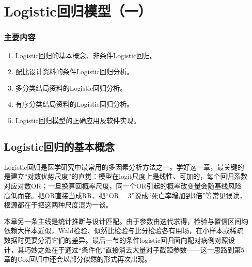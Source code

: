 \chapter{Logistic回归模型（一）}
\subsection*{主要内容}
\begin{enumerate}
\item Logistic回归的基本概念、非条件Logistic回归。
\item 配比设计资料的条件Logistic回归分析。
\item 多分类结局资料的Logistic回归分析。
\item 有序分类结局资料的Logistic回归分析。
\item Logistic回归模型的正确应用及软件实现。
\end{enumerate}
\section{Logistic回归的基本概念}
Logistic回归是医学研究中最常用的多因素分析方法之一。学好这一章，最关键的是建立“对数优势尺度”的直觉：模型在logit尺度上是线性、可加的，每个回归系数对应对数OR；一旦换算回概率尺度，同一个OR引起的概率改变量会随基线风险高低而变。把OR直接当成RR、把“OR$=3$”说成“死亡率增加到3倍”等常见误读，根源都在于把这两种尺度混为一谈。

本章另一条主线是统计推断与设计匹配。由于参数由迭代求得，检验与置信区间均依赖大样本近似，Wald检验、似然比检验与比分检验各有用场，在小样本或稀疏数据时更要分清它们的差异。最后一节的条件logistic回归面向配对病例对照设计，其巧妙之处在于通过“条件化”直接消去大量对子截距参数——这一思路到第5章的Cox回归中还会以部分似然的形式再次出现。
